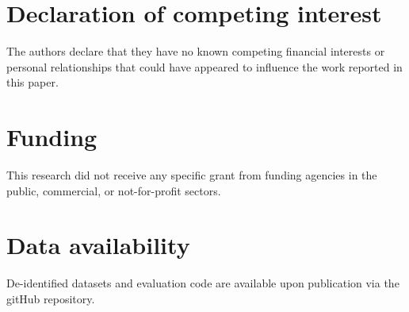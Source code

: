 \documentclass[preprint,12pt]{elsarticle}
\begin{document}
\section*{Declaration of competing interest}
The authors declare that they have no known competing financial interests or personal relationships that could have appeared to influence the work reported in this paper.

\section*{Funding}
This research did not receive any specific grant from funding agencies in the public, commercial, or not-for-profit sectors.

\section*{Data availability}
De-identified datasets and evaluation code are available upon publication via the gitHub repository.



\end{document}
